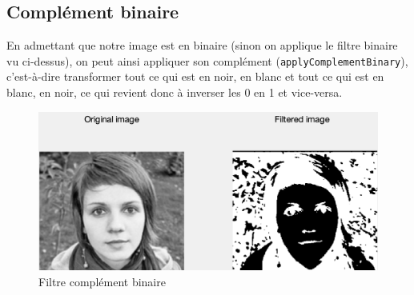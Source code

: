 \documentclass[12pt,a4paper]{article}
\begin{document}
\subsection{Complément binaire}
En admettant que notre image est en binaire (sinon on applique le filtre binaire vu ci-dessus), on peut ainsi appliquer son complément (\texttt{applyComplementBinary}), c'est-à-dire transformer tout ce qui est en noir, en blanc et tout ce qui est en blanc, en noir, ce qui revient donc à inverser les 0 en 1 et vice-versa.

\begin{figure}[H]
\centering
\includegraphics[scale=0.5]{img/complement-binary}
\caption{Filtre complément binaire}
\end{figure}
\end{document}
